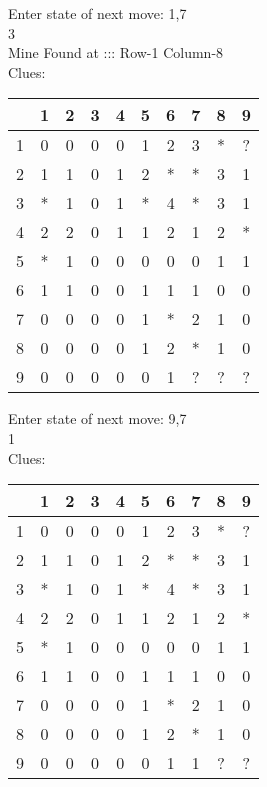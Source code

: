 Enter state of next move: 1,7\\
3\\
Mine Found at ::: Row-1 Column-8\\
Clues:\\
\begin{tabular}{|c|c|c|c|c|c|c|c|c|c|}
\hline
  & 1 & 2 & 3 & 4 & 5 & 6 & 7 & 8 & 9\\
\hline
1 & 0 & 0 & 0 & 0 & 1 & 2 & 3 & * & ?\\
\hline
2 & 1 & 1 & 0 & 1 & 2 & * & * & 3 & 1\\
\hline
3 & * & 1 & 0 & 1 & * & 4 & * & 3 & 1\\
\hline
4 & 2 & 2 & 0 & 1 & 1 & 2 & 1 & 2 & *\\
\hline
5 & * & 1 & 0 & 0 & 0 & 0 & 0 & 1 & 1\\
\hline
6 & 1 & 1 & 0 & 0 & 1 & 1 & 1 & 0 & 0\\
\hline
7 & 0 & 0 & 0 & 0 & 1 & * & 2 & 1 & 0\\
\hline
8 & 0 & 0 & 0 & 0 & 1 & 2 & * & 1 & 0\\
\hline
9 & 0 & 0 & 0 & 0 & 0 & 1 & ? & ? & ?\\
\hline
\end{tabular}

Enter state of next move: 9,7\\
1\\
Clues:\\
\begin{tabular}{|c|c|c|c|c|c|c|c|c|c|}
\hline
  & 1 & 2 & 3 & 4 & 5 & 6 & 7 & 8 & 9\\
\hline
1 & 0 & 0 & 0 & 0 & 1 & 2 & 3 & * & ?\\
\hline
2 & 1 & 1 & 0 & 1 & 2 & * & * & 3 & 1\\
\hline
3 & * & 1 & 0 & 1 & * & 4 & * & 3 & 1\\
\hline
4 & 2 & 2 & 0 & 1 & 1 & 2 & 1 & 2 & *\\
\hline
5 & * & 1 & 0 & 0 & 0 & 0 & 0 & 1 & 1\\
\hline
6 & 1 & 1 & 0 & 0 & 1 & 1 & 1 & 0 & 0\\
\hline
7 & 0 & 0 & 0 & 0 & 1 & * & 2 & 1 & 0\\
\hline
8 & 0 & 0 & 0 & 0 & 1 & 2 & * & 1 & 0\\
\hline
9 & 0 & 0 & 0 & 0 & 0 & 1 & 1 & ? & ?\\
\hline
\end{tabular}


